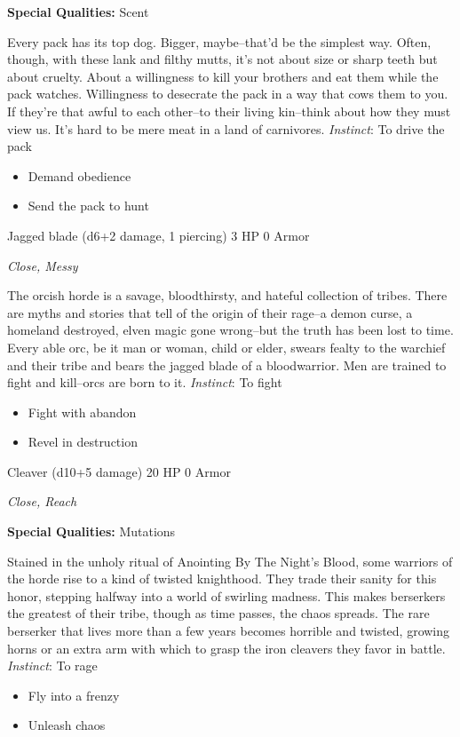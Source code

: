 \textbf{Special Qualities:}
Scent

\HRule
Every pack has its top dog. Bigger, maybe--that'd be the simplest way. Often, though, with these lank and filthy mutts, it's not about size or sharp teeth but about cruelty. About a willingness to kill your brothers and eat them while the pack watches. Willingness to desecrate the pack in a way that cows them to you. If they're that awful to each other--to their living kin--think about how they must view us. It's hard to be mere meat in a land of carnivores. \emph{Instinct}: To drive the pack
\begin{itemize}
\item Demand obedience
\item Send the pack to hunt
\end{itemize}

\HRule
{}

Jagged blade (d6+2 damage, 1 piercing)\hspace*{\fill} 3 HP 0 Armor

\emph{Close, Messy}

\HRule
The orcish horde is a savage, bloodthirsty, and hateful collection of tribes. There are myths and stories that tell of the origin of their rage--a demon curse, a homeland destroyed, elven magic gone wrong--but the truth has been lost to time. Every able orc, be it man or woman, child or elder, swears fealty to the warchief and their tribe and bears the jagged blade of a bloodwarrior. Men are trained to fight and kill--orcs are born to it. \emph{Instinct}: To fight
\begin{itemize}
\item Fight with abandon
\item Revel in destruction
\end{itemize}
\newpage
\HRule
{}

Cleaver (d10+5 damage)\hspace*{\fill} 20 HP 0 Armor

\emph{Close, Reach}

\textbf{Special Qualities:}
Mutations

\HRule
Stained in the unholy ritual of Anointing By The Night's Blood, some warriors of the horde rise to a kind of twisted knighthood. They trade their sanity for this honor, stepping halfway into a world of swirling madness. This makes berserkers the greatest of their tribe, though as time passes, the chaos spreads. The rare berserker that lives more than a few years becomes horrible and twisted, growing horns or an extra arm with which to grasp the iron cleavers they favor in battle. \emph{Instinct}: To rage
\begin{itemize}
\item Fly into a frenzy
\item Unleash chaos
\end{itemize}
\newpage
\HRule
{}

